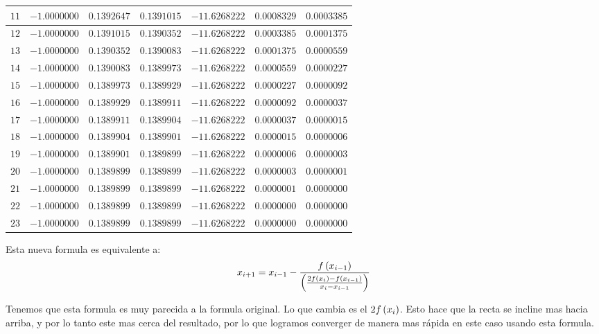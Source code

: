 \begin{center}
\begin{longtable}{|c|c|c|c|c|c|c|}
		$11$ & $-1.0000000$ & $0.1392647$ & $0.1391015$ & $-11.6268222$ & $0.0008329$ & $0.0003385$ \\ \hline
		$12$ & $-1.0000000$ & $0.1391015$ & $0.1390352$ & $-11.6268222$ & $0.0003385$ & $0.0001375$ \\ \hline
		$13$ & $-1.0000000$ & $0.1390352$ & $0.1390083$ & $-11.6268222$ & $0.0001375$ & $0.0000559$ \\ \hline
		$14$ & $-1.0000000$ & $0.1390083$ & $0.1389973$ & $-11.6268222$ & $0.0000559$ & $0.0000227$ \\ \hline
		$15$ & $-1.0000000$ & $0.1389973$ & $0.1389929$ & $-11.6268222$ & $0.0000227$ & $0.0000092$ \\ \hline
		$16$ & $-1.0000000$ & $0.1389929$ & $0.1389911$ & $-11.6268222$ & $0.0000092$ & $0.0000037$ \\ \hline
		$17$ & $-1.0000000$ & $0.1389911$ & $0.1389904$ & $-11.6268222$ & $0.0000037$ & $0.0000015$ \\ \hline
		$18$ & $-1.0000000$ & $0.1389904$ & $0.1389901$ & $-11.6268222$ & $0.0000015$ & $0.0000006$ \\ \hline
		$19$ & $-1.0000000$ & $0.1389901$ & $0.1389899$ & $-11.6268222$ & $0.0000006$ & $0.0000003$ \\ \hline
		$20$ & $-1.0000000$ & $0.1389899$ & $0.1389899$ & $-11.6268222$ & $0.0000003$ & $0.0000001$ \\ \hline
		$21$ & $-1.0000000$ & $0.1389899$ & $0.1389899$ & $-11.6268222$ & $0.0000001$ & $0.0000000$ \\ \hline
		$22$ & $-1.0000000$ & $0.1389899$ & $0.1389899$ & $-11.6268222$ & $0.0000000$ & $0.0000000$ \\ \hline
		$23$ & $-1.0000000$ & $0.1389899$ & $0.1389899$ & $-11.6268222$ & $0.0000000$ & $0.0000000$ \\ \hline
	\end{longtable}
\end{center}

\vspace{1cm}

Esta nueva formula es equivalente a:
\begin{equation*}
	x_{i+1} = x_{i-1} - \frac{f \left( x_{i-1} \right)}
	{\left( \frac{2 f \left( x_{i} \right) - f \left( x_{i-1} \right)}
	{x_{i} - x_{i-1}} \right)}
\end{equation*}

Tenemos que esta formula es muy parecida a la formula original.
Lo que cambia es el $2 f \left( x_{i} \right)$. Esto hace que la recta
se incline mas hacia arriba, y por lo tanto este mas cerca del resultado, por lo que logramos converger de manera mas rápida en este caso usando esta formula.